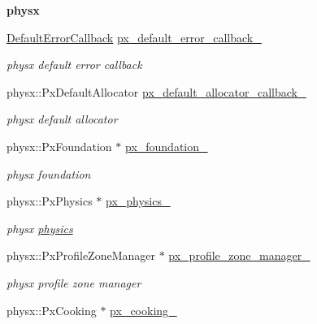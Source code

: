 \begin{Indent}{\bf physx}\par
{\em \label{_amgrpd5de07ce9583c40399aa882e8d4ef737}
 }\begin{DoxyCompactItemize}
\item 
\hyperlink{classDefaultErrorCallback}{DefaultErrorCallback} \hyperlink{classnebula_1_1content_1_1physics_1_1base_acbed0d466473d89c816bfb86d5ee54c1}{px\_\-default\_\-error\_\-callback\_\-}
\begin{DoxyCompactList}\small\item\em physx default error callback \item\end{DoxyCompactList}\item 
physx::PxDefaultAllocator \hyperlink{classnebula_1_1content_1_1physics_1_1base_af48d16416f3fe40622294c185e187c59}{px\_\-default\_\-allocator\_\-callback\_\-}
\begin{DoxyCompactList}\small\item\em physx default allocator \item\end{DoxyCompactList}\item 
physx::PxFoundation $\ast$ \hyperlink{classnebula_1_1content_1_1physics_1_1base_a63675a6e212b91289f28cbf29675bf30}{px\_\-foundation\_\-}
\begin{DoxyCompactList}\small\item\em physx foundation \item\end{DoxyCompactList}\item 
physx::PxPhysics $\ast$ \hyperlink{classnebula_1_1content_1_1physics_1_1base_a0f5bbd5c17cdb78f856b30ef2e423848}{px\_\-physics\_\-}
\begin{DoxyCompactList}\small\item\em physx \hyperlink{namespacenebula_1_1content_1_1physics}{physics} \item\end{DoxyCompactList}\item 
physx::PxProfileZoneManager $\ast$ \hyperlink{classnebula_1_1content_1_1physics_1_1base_a7e94c5f6e3573c17c4c1330a7726bcc6}{px\_\-profile\_\-zone\_\-manager\_\-}
\begin{DoxyCompactList}\small\item\em physx profile zone manager \item\end{DoxyCompactList}\item 
physx::PxCooking $\ast$ \hyperlink{classnebula_1_1content_1_1physics_1_1base_a13ae9c72e0c5138ab97fb2f91f574d51}{px\_\-cooking\_\-}

\end{DoxyCompactItemize}
\end{Indent}
